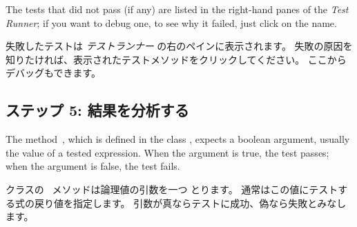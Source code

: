 \documentclass[a4paper,10pt,twoside]{book}
\begin{document}
{%


The tests that did not pass (if any) are listed in the right-hand panes of
the \emph{Test Runner};
if you want to debug one, to see why it failed, just click on the name.
\fi

失敗したテストは \emph{テストランナー} の右のペインに表示されます。
失敗の原因を知りたければ、表示されたテストメソッドをクリックしてください。
ここからデバッグもできます。


\subsection{ステップ 5: 結果を分析する}

The method \,, which is defined in the class
, expects a boolean argument, usually the value of a tested expression.  When the argument is
true, the
test passes; when the argument is false, the test fails.
\fi

 クラスの \ メソッドは論理値の引数を一つ
とります。
通常はこの値にテストする式の戻り値を指定します。
引数が真ならテストに成功、偽なら失敗とみなします。

}
\end{document}
